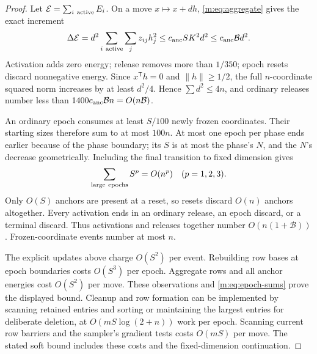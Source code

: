 \documentclass[11pt]{amsart}
\theoremstyle{definition}\newtheorem{definition}[theorem]{Definition}
\theoremstyle{remark}\newtheorem{remark}[theorem]{Remark}
\numberwithin{equation}{section}
\begin{document}
\begin{proof}
Let $\mathcal E=\sum_{i\ {\rm active}}E_i$. On a move $x\mapsto x+dh$,
\eqref{m:eq:aggregate} gives the exact increment
\begin{equation}
 \Delta\mathcal E=d^2\sum_{i\ {\rm active}}\sum_jz_{ij}h_j^2
       \le c_{\rm anc}SK^2d^2\le c_{\rm anc}\mathcal B d^2.
                                                               \label{m:eq:anchor-injection}
\end{equation}
Activation adds zero energy; release removes more than $1/350$;
epoch resets discard nonnegative energy. Since $x^{\mathsf T}h=0$ and
$\|h\|\ge1/2$, the full $n$-coordinate squared norm increases by at least
$d^2/4$. Hence $\sum d^2\le4n$, and ordinary releases number less than
$1400c_{\rm anc}\mathcal B n=O(n\mathcal B)$.

An ordinary epoch consumes at least $S/100$ newly frozen coordinates.
Their starting sizes therefore sum to at most $100n$. At most one epoch
per phase ends earlier because of the phase boundary; its $S$ is at most
the phase's $N$, and the $N$'s decrease geometrically. Including the final
transition to fixed dimension gives
\begin{equation}
                  \sum_{\rm large\ epochs} S^p=O(n^p)
                         \quad(p=1,2,3).                  \label{m:eq:epoch-sums}
\end{equation}
Only $O(S)$ anchors are present at a reset, so resets discard $O(n)$
anchors altogether. Every activation ends in an ordinary release, an epoch discard, or a
terminal discard. Thus activations and
releases together number $O(n(1+\mathcal B))$. Frozen-coordinate events
number at most $n$.

The explicit updates above charge $O(S^2)$ per event. Rebuilding row
bases at epoch boundaries costs $O(S^3)$ per epoch. Aggregate rows and
all anchor energies cost $O(S^2)$ per move. These observations and
\eqref{m:eq:epoch-sums} prove the displayed bound. Cleanup and row formation
can be implemented by scanning retained entries and sorting or maintaining
the largest entries for deliberate deletion, at
$O(mS\log(2+n))$ work per epoch. Scanning current row barriers and the
sampler's gradient tests costs $O(mS)$ per move. The stated soft bound
includes these costs and the fixed-dimension continuation.
\end{proof}
\end{document}
